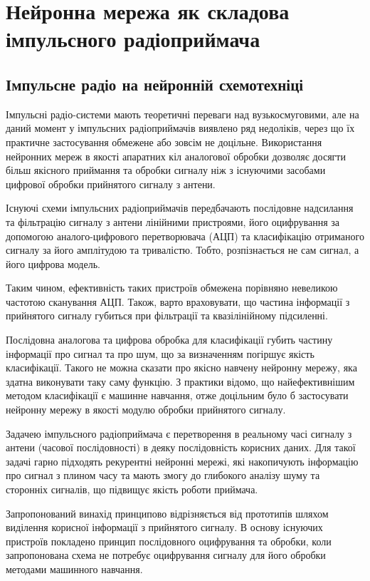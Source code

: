 \chapter{Нейронна мережа як складова імпульсного радіоприймача}
\label{ch:neuron}

\section{Імпульсне радіо на нейронній схемотехніці}

Імпульсні радіо-системи мають теоретичні переваги над вузькосмуговими, 
але на даний момент у імпульсних радіоприймачів виявлено ряд недоліків, 
через що їх практичне застосування обмежене або зовсім не доцільне. 
Використання нейронних мереж в якості апаратних кіл аналогової обробки 
дозволяє досягти більш якісного приймання та обробки сигналу ніж з 
існуючими засобами цифрової обробки прийнятого сигналу з антени.

Існуючі схеми імпульсних радіоприймачів передбачають послідовне надсилання 
та фільтрацію сигналу з антени лінійними пристроями, його оцифрування за 
допомогою аналого-цифрового перетворювача (АЦП) та класифікацію отриманого 
сигналу за його амплітудою та тривалістю. Тобто, розпізнається не сам сигнал, 
а його цифрова модель.

Таким чином, ефективність таких пристроїв обмежена порівняно невеликою 
частотою сканування  АЦП. Також, варто враховувати, що частина інформації 
з прийнятого сигналу губиться при фільтрації та квазілінійному підсиленні.

Послідовна аналогова та цифрова обробка для класифікації губить частину 
інформації про сигнал та про шум, що за визначенням погіршує якість 
класифікації. Такого не можна сказати про якісно навчену нейронну мережу, 
яка здатна виконувати таку саму функцію. З практики відомо, що 
найефективнішим методом класифікації є машинне навчання, отже доцільним 
було б застосувати нейронну мережу в якості модулю обробки прийнятого 
сигналу. 

Задачею імпульсного радіоприймача є перетворення в реальному часі сигналу 
з антени (часової послідовності) в деяку послідовність корисних даних. 
Для такої задачі гарно підходять рекурентні нейронні мережі, які накопичують 
інформацію про сигнал з плином часу та мають змогу до глибокого аналізу шуму 
та сторонніх сигналів, що підвищує якість роботи приймача.

Запропонований винахід принципово відрізняється від прототипів шляхом 
виділення корисної інформації з прийнятого сигналу. В основу існуючих 
пристроїв покладено принцип послідовного оцифрування та обробки, коли запропонована схема не потребує оцифрування сигналу для його обробки 
методами машинного навчання.

